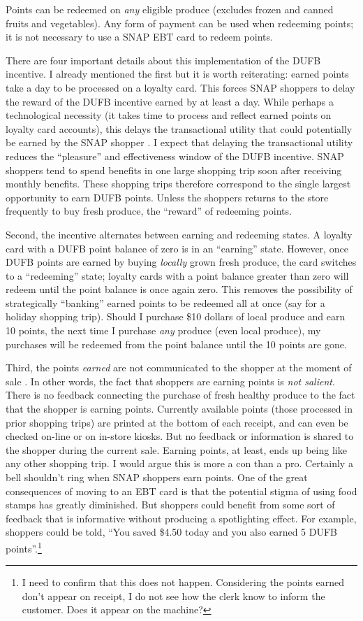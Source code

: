 \documentclass[12pt,letterpaperpaper,]{book}
\begin{document}
Points can be redeemed on \emph{any} eligible produce (excludes frozen
and canned fruits and vegetables). Any form of payment can be used when
redeeming points; it is not necessary to use a SNAP EBT card to redeem
points.

There are four important details about this implementation of the DUFB
incentive. I already mentioned the first but it is worth reiterating:
earned points take a day to be processed on a loyalty card. This forces
SNAP shoppers to delay the reward of the DUFB incentive earned by at
least a day. While perhaps a technological necessity (it takes time to
process and reflect earned points on loyalty card accounts), this delays
the transactional utility that could potentially be earned by the SNAP
shopper \citep{thaler_mental_1985}. I expect that delaying the
transactional utility reduces the ``pleasure'' and effectiveness window
of the DUFB incentive. SNAP shoppers tend to spend benefits in one large
shopping trip soon after receiving monthly benefits. These shopping
trips therefore correspond to the single largest opportunity to earn
DUFB points. Unless the shoppers returns to the store frequently to buy
fresh produce, the ``reward'' of redeeming points.

Second, the incentive alternates between earning and redeeming states. A
loyalty card with a DUFB point balance of zero is in an ``earning''
state. However, once DUFB points are earned by buying \emph{locally}
grown fresh produce, the card switches to a ``redeeming'' state; loyalty
cards with a point balance greater than zero will redeem until the point
balance is once again zero. This removes the possibility of
strategically ``banking'' earned points to be redeemed all at once (say
for a holiday shopping trip). Should I purchase \$10 dollars of local
produce and earn 10 points, the next time I purchase \emph{any} produce
(even local produce), my purchases will be redeemed from the point
balance until the 10 points are gone.

Third, the points \emph{earned} are not communicated to the shopper at
the moment of sale \citep{family_fare_double_2016}. In other words, the
fact that shoppers are earning points is \emph{not salient}. There is no
feedback connecting the purchase of fresh healthy produce to the fact
that the shopper is earning points. Currently available points (those
processed in prior shopping trips) are printed at the bottom of each
receipt, and can even be checked on-line or on in-store kiosks. But no
feedback or information is shared to the shopper during the current
sale. Earning points, at least, ends up being like any other shopping
trip. I would argue this is more a con than a pro. Certainly a bell
shouldn't ring when SNAP shoppers earn points. One of the great
consequences of moving to an EBT card is that the potential stigma of
using food stamps has greatly diminished. But shoppers could benefit
from some sort of feedback that is informative without producing a
spotlighting effect. For example, shoppers could be told, ``You saved
\$4.50 today and you also earned 5 DUFB points''.\footnote{I need to
  confirm that this does not happen. Considering the points earned don't
  appear on receipt, I do not see how the clerk know to inform the
  customer. Does it appear on the machine?}
\end{document}
